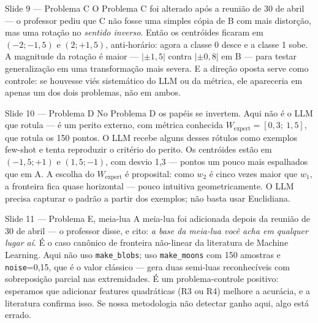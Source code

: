\documentclass[aspectratio=169,10pt]{beamer}
\begin{document}
\begin{frame}{Slide 9 --- Problema C}
\footnotesize
O Problema C foi alterado ap\'os a reuni\~ao de 30 de abril --- o professor pediu que C n\~ao fosse uma simples c\'opia de B com mais distor\c{c}\~ao, mas uma rota\c{c}\~ao no \emph{sentido inverso}. Ent\~ao os centr\'oides ficaram em $(-2; -1{,}5)$ e $(2; +1{,}5)$, anti-hor\'ario: agora a classe 0 desce e a classe 1 sobe. A magnitude da rota\c{c}\~ao \'e maior --- $|\pm 1{,}5|$ contra $|\pm 0{,}8|$ em B --- para testar generaliza\c{c}\~ao em uma transforma\c{c}\~ao mais severa. E a dire\c{c}\~ao oposta serve como controle: se houvesse vi\'es sistem\'atico do LLM ou da m\'etrica, ele apareceria em apenas um dos dois problemas, n\~ao em ambos.
\end{frame}

\begin{frame}{Slide 10 --- Problema D}
\footnotesize
No Problema D os pap\'eis se invertem. Aqui n\~ao \'e o LLM que rotula --- \'e um perito externo, com m\'etrica conhecida $W_{\text{expert}} = [0{,}3;\ 1{,}5]$, que rotula os 150 pontos. O LLM recebe alguns desses r\'otulos como exemplos few-shot e tenta reproduzir o crit\'erio do perito. Os centr\'oides est\~ao em $(-1{,}5; +1)$ e $(1{,}5; -1)$, com desvio 1{,}3 --- pontos um pouco mais espalhados que em A. A escolha do $W_{\text{expert}}$ \'e proposital: como $w_2$ \'e cinco vezes maior que $w_1$, a fronteira fica quase horizontal --- pouco intuitiva geometricamente. O LLM precisa capturar o padr\~ao a partir dos exemplos; n\~ao basta usar Euclidiana.
\end{frame}

\begin{frame}{Slide 11 --- Problema E, meia-lua}
\footnotesize
A meia-lua foi adicionada depois da reuni\~ao de 30 de abril --- o professor disse, e cito: \emph{a base da meia-lua voc\^e acha em qualquer lugar a\'i}. \'E o caso can\^onico de fronteira n\~ao-linear da literatura de Machine Learning. Aqui n\~ao uso \texttt{make\_blobs}; uso \texttt{make\_moons} com 150 amostras e \texttt{noise}=0{,}15, que \'e o valor cl\'assico --- gera duas semi-luas reconhec\'iveis com sobreposi\c{c}\~ao parcial nas extremidades. \'E um problema-controle positivo: esperamos que adicionar features quadr\'aticas (R3 ou R4) melhore a acur\'acia, e a literatura confirma isso. Se nossa metodologia n\~ao detectar ganho aqui, algo est\'a errado.
\end{frame}
\end{document}
